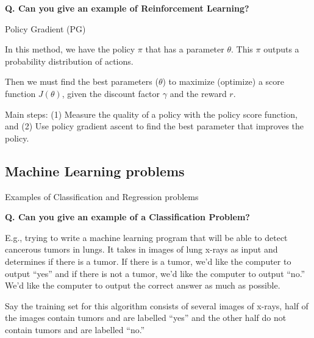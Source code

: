 \begin{frame}[fragile]{\textbf{Q. Can you give an example of Reinforcement Learning?}}
  \begin{wideitemize}
    \item Policy Gradient (PG)
    \begin{wideitemize}
      \item In this method, we have the policy $\pi$ that has a parameter $\theta$. This $\pi$
      outputs a probability distribution of actions.
      \item Then we must find the best parameters ($\theta$) to maximize (optimize) a score
      function $J(\theta)$, given the discount factor $\gamma$ and the reward $r.$
      \item Main steps: (1) Measure the quality of a policy with the policy score function, and
      (2) Use policy gradient ascent to find the best parameter that improves the policy.
    \end{wideitemize}
  \end{wideitemize}
\end{frame}

\subsection{Machine Learning problems}
\begin{transitionsubframe}
  \begin{center}
    \Huge Examples of Classification and Regression problems
  \end{center}
\end{transitionsubframe}


\begin{frame}[fragile]{\textbf{Q. Can you give an example of a Classification Problem?}}
  \begin{wideitemize}
    \item E.g., trying to write a machine learning program that will be able to detect cancerous
    tumors in lungs. It takes in images of lung x-rays as input and determines if there is a tumor.
    If there is a tumor, we'd like the computer to output ``yes'' and if there is not a tumor, we'd
    like the computer to output ``no.'' We’d like the computer to output the correct answer as much as possible.
    \item Say the training set for this algorithm consists of several images of x-rays, half of the images
    contain tumors and are labelled ``yes'' and the other half do not contain tumors and are labelled ``no.''
  \end{wideitemize}
\end{frame}

